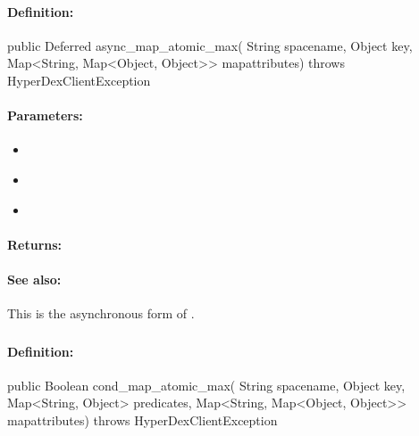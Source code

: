 \paragraph{Definition:}
\begin{javacode}
public Deferred async_map_atomic_max(
        String spacename,
        Object key,
        Map<String, Map<Object, Object>> mapattributes) throws HyperDexClientException
\end{javacode}

\paragraph{Parameters:}
\begin{itemize}[noitemsep]
\item {}\\

\item {}\\

\item {}\\

\end{itemize}

\paragraph{Returns:}


\paragraph{See also:}  This is the asynchronous form of .

\pagebreak
\subsubsection{}
\label{api:java:cond_map_atomic_max}


\paragraph{Definition:}
\begin{javacode}
public Boolean cond_map_atomic_max(
        String spacename,
        Object key,
        Map<String, Object> predicates,
        Map<String, Map<Object, Object>> mapattributes) throws HyperDexClientException
\end{javacode}

